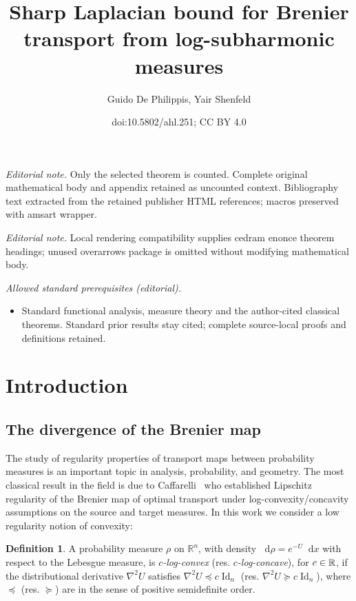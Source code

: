 \documentclass[10pt]{amsart}
\title{Sharp Laplacian bound for Brenier transport from log-subharmonic measures}
\author{Guido De Philippis, Yair Shenfeld}
\date{doi:10.5802/ahl.251; CC BY 4.0}
\theoremstyle{definition}\newtheorem{defi}[theo]{Definition}\newtheorem{rema}[theo]{Remark}\newtheorem{exam}[theo]{Example}\newtheorem{exem}[theo]{Example}\newtheorem{nota}[theo]{Notation}
\newcommand{\R}{\mathbb R}
\DeclareMathOperator{\Id}{Id}
\newcommand{\dd}{n}
\newcommand{\conv}{c}
\newcommand{\prob}{\rho}
\newcommand*\diff{\mathop{}\!\mathrm{d}}
\let\oldin\in
\renewcommand{\in}{\mathchoice{\oldin}{\oldin}{\,\oldin\,}{\,\oldin\,}}
\begin{document}
\maketitle
\noindent\textit{Editorial note.} Only the selected theorem is counted. Complete original mathematical body and appendix retained as uncounted context. Bibliography text extracted from the retained publisher HTML references; macros preserved with amsart wrapper.\par\medskip
\noindent\textit{Editorial note.} Local rendering compatibility supplies cedram enonce theorem headings; unused overarrows package is omitted without modifying mathematical body.\par\medskip
\noindent\textit{Allowed standard prerequisites (editorial).}\begin{itemize}
\item Standard functional analysis, measure theory and the author-cited classical theorems. Standard prior results stay cited; complete source-local proofs and definitions retained.
\end{itemize}\medskip


\section{Introduction}



\subsection{The divergence of the Brenier map}

The study of regularity properties of transport maps between probability measures is an important topic in analysis, probability, and geometry. The most classical result in the field is due to Caffarelli~\cite{MR1800860} who established Lipschitz regularity of the Brenier map of optimal transport under log-convexity/concavity assumptions on the source and target measures. In this work we consider a low regularity notion of convexity:


\begin{defi}\label{def:log_concave}
A probability measure $\prob$ on $\R^{\dd}$, with density $\diff \prob=e^{-U}\diff x$ with respect to the Lebesgue measure, is \emph{$\conv$-log-convex} (res. \emph{$\conv$-log-concave}), for $\conv\in \R$, if the distributional derivative $\nabla^2U$ satisfies $\nabla^2U \preceq \conv \Id_{\dd}$ (res. $\nabla^2U \succeq \conv \Id_{\dd}$), where $\preceq$ (res. $\succeq$) are in the sense of positive semidefinite order.
\end{defi}
\end{document}
